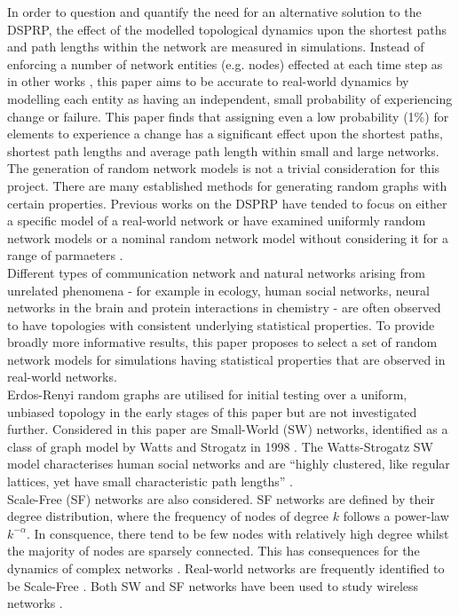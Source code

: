 \documentclass[
	a4paper, %
	10pt, %
	unnumberedsections, %
	twoside, %
]{LTJournalArticle}
\begin{document}
In order to question and quantify the need for an alternative solution to the DSPRP, the effect of the modelled topological dynamics upon the shortest paths and path lengths within the network are measured in simulations. Instead of enforcing a number of network entities (e.g. nodes) effected at each time step as in other works \cite{yang:10}, this paper aims to be accurate to real-world dynamics by modelling each entity as having an independent, small probability of experiencing change or failure. This paper finds that assigning even a low probability (1\%) for elements to experience a change has a significant effect upon the shortest paths, shortest path lengths and average path length within small and large networks. \\

The generation of random network models is not a trivial consideration for this project. There are many established methods for generating random graphs with certain properties. Previous works on the DSPRP have tended to focus on either a specific model of a real-world network \cite{yang:10} or have examined uniformly random network models or a nominal random network model without considering it for a range of parmaeters \cite{kumar:10} \cite{yussof:09}. \\

Different types of communication network and natural networks arising from unrelated phenomena - for example in ecology, human social networks, neural networks in the brain and protein interactions in chemistry - are often observed to have topologies with consistent underlying statistical properties. To provide broadly more informative results, this paper proposes to select a set of random network models for simulations having statistical properties that are observed in real-world networks. \\

Erdos-Renyi random graphs are utilised for initial testing over a uniform, unbiased topology in the early stages of this paper but are not investigated further. Considered in this paper are Small-World (SW) networks, identified as a class of graph model by Watts and Strogatz in 1998 \cite{watts:98}. The Watts-Strogatz SW model characterises human social networks and are ``highly clustered, like regular lattices, yet have small characteristic path lengths'' \cite{watts:98}. \\

Scale-Free (SF) networks are also considered. SF networks are defined by their degree distribution, where the frequency of nodes of degree \(k\) follows a power-law \( k^{-\alpha}\). In consquence, there tend to be few nodes with relatively high degree whilst the majority of nodes are sparsely connected. This has consequences for the dynamics of complex networks \cite{broido:19}. Real-world networks are frequently identified to be Scale-Free \cite{broido:19}. Both SW and SF networks have been used to study wireless networks \cite{sohn:17} \cite{kim:12}. \\
\end{document}
